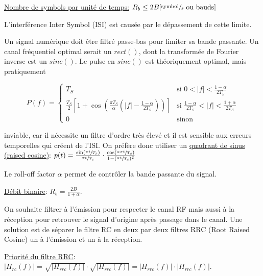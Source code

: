 \underline{Nombre de symbols par unité de temps:} $R_b \leq 2B[\sfrac{\text{symbol}}{s}\text{ ou bauds}]$

L'interférence Inter Symbol (ISI) est causée par le dépassement de cette limite.

Un signal numérique doit être filtré passe-bas pour limiter sa bande passante.
Un canal fréquentiel optimal serait un $rect()$, dont la transformée de Fourier inverse
est un $sinc()$. Le pulse en $sinc()$ est théoriquement optimal, mais pratiquement

\setlength{\abovedisplayskip}{-5pt}
\setlength{\belowdisplayskip}{-5pt}
\begin{figure}
    \begin{equation*}
        P(f)=\begin{cases}
            T_S                                                                                                       & \text{si } 0<|f| < \frac{1-\alpha}{2T_S}                       \\
            \frac{T_S}{2}\left[1+\cos\left(\frac{\pi T_S}{\alpha}\left(|f|-\frac{1-\alpha}{2T_S}\right)\right)\right] & \text{si } \frac{1-\alpha}{2T_S} < |f| < \frac{1+\alpha}{2T_S} \\
            0                                                                                                         & \text{sinon}
        \end{cases}
    \end{equation*}
\end{figure}
inviable, car il nécessite un filtre d'ordre très élevé et il est sensible aux erreurs
temporelles qui créent de l'ISI.
On préfère donc utiliser un \underline{quadrant de sinus (raised cosine)}: $p(t) = \frac{\sin(\sfrac{\pi t}{T_S})}{\sfrac{\pi t}{T_S}}\cdot\frac{\cos(\sfrac{\alpha\pi t}{T_S})}{1-(\sfrac{\alpha t}{T_S})^2}$

Le roll-off factor $\alpha$ permet de contrôler la bande passante du signal.

\underline{Débit binaire}: $R_b = \frac{2B}{1+\alpha}$.

On souhaite filtrer à l'émission pour respecter le canal RF mais aussi à la réception
pour retrouver le signal d'origine après passage dans le canal. Une solution est de
séparer le filtre RC en deux par deux filtres RRC (Root Raised Cosine) un à l'émission et
un à la réception.

\underline{Priorité du filtre RRC}: $\left|H_{rc}(f)\right|=\sqrt{\left|H_{rrc}(f)\right|}\cdot\sqrt{\left|H_{rrc}(f)\right|}=\left|H_{rrc}(f)\right|\cdot \left|H_{rrc}(f)\right|$.
